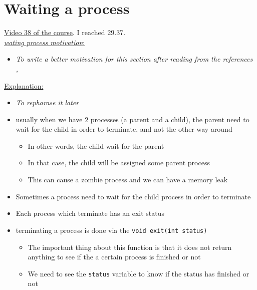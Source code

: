 \documentclass[12pt,a4paper]{book}
\begin{document}
\newpage
\section{Waiting a process}


\underline{Video 38 of the course}. I reached 29.37.\\


 \underline{\textit{wating process motivation}:}

\begin{itemize}

\item \textit{To write a better motivation for this section after reading from the references \cite{book_Linux_System_Programming_Robert_Love}, \cite{book_opearting_system_concepts}}

\end{itemize} 

\underline{Explanation:}

\begin{itemize}

\item \textit{To repharase it later}

\item usually when we have 2 processes (a parent and a child), the parent need to wait for the child in order to terminate, and not the other way around

	\begin{itemize}
	\item In other words, the child wait for the parent
	
	\item In that case, the child will be assigned some parent process
	
	\item This can cause a zombie process and we can have a memory leak 
	\end{itemize}

\item  Sometimes a process need to wait for the child process in order to terminate

\item  Each process which terminate has an exit status

\item terminating a process is done via the \verb|void exit(int status)|

    \begin{itemize}
        \item The important thing about this function is that it does not return anything to see if the a certain process is finished or not

        \item  We need to see the \verb|status| variable to know if the status has finished or not
    \end{itemize}

\end{itemize}
\end{document}
